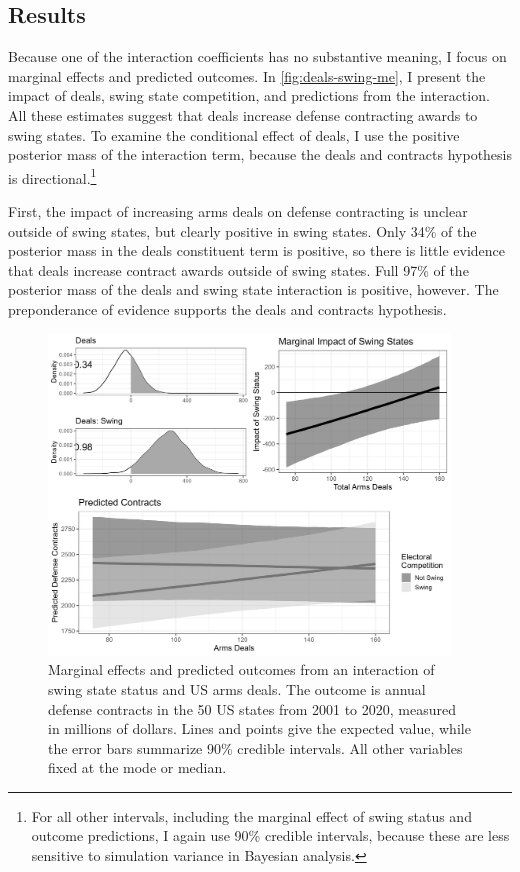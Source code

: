 \documentclass[12pt]{article}
\begin{document}


\subsection{Results}


Because one of the interaction coefficients has no substantive meaning, I focus on marginal effects and predicted outcomes.
In \autoref{fig:deals-swing-me}, I present the impact of deals, swing state competition, and predictions from the interaction.
All these estimates suggest that deals increase defense contracting awards to swing states. 
To examine the conditional effect of deals, I use the positive posterior mass of the interaction term, because the deals and contracts hypothesis is directional.\footnote{For all other intervals, including the marginal effect of swing status and outcome predictions, I again use 90\% credible intervals, because these are less sensitive to simulation variance in Bayesian analysis.}


First, the impact of increasing arms deals on defense contracting is unclear outside of swing states, but clearly positive in swing states. 
Only 34\% of the posterior mass in the deals constituent term is positive, so there is little evidence that deals increase contract awards outside of swing states. 
Full 97\% of the posterior mass of the deals and swing state interaction is positive, however. 
The preponderance of evidence supports the deals and contracts hypothesis.


\begin{figure}[htpb]
	\centering
		\includegraphics[width=0.95\textwidth]{../figures/deals-swing-me.png}
	\caption{Marginal effects and predicted outcomes from an interaction of swing state status and US arms deals. The outcome is annual defense contracts in the 50 US states from 2001 to 2020, measured in millions of dollars. Lines and points give the expected value, while the error bars summarize 90\% credible intervals. All other variables fixed at the mode or median.}
	\label{fig:deals-swing-me}
\end{figure}
\end{document}
